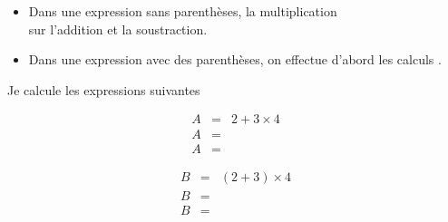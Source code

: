 \begin{myprops}
	\begin{itemize}
		\item Dans une expression sans parenthèses, la multiplication \\ \hspace*{6cm} sur l'addition et la soustraction.
		
		\item Dans une expression avec des parenthèses, on effectue d'abord les calculs \hspace*{6cm}.
	\end{itemize}
\end{myprops}


\begin{myexs}
	Je calcule les expressions suivantes
	
	\begin{multicols}{2}
		\begin{eqnarray*}
			A &=& 2 + 3 \times 4 \\
			A &=&  \\
			A &=& 
		\end{eqnarray*}
	
	
		\begin{eqnarray*}
			B &=& (2 + 3) \times 4 \\
			B &=&  \\
			B &=& 
		\end{eqnarray*}
	\end{multicols}
\end{myexs}